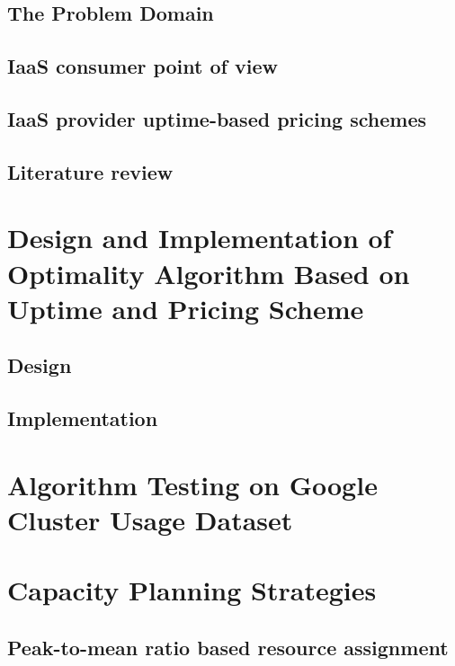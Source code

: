 \documentclass[]{final_report}
\begin{document}
\section{The Problem Domain}

\section{IaaS consumer point of view}

\section{IaaS provider uptime-based pricing schemes}

\section{Literature review}



\chapter{Design and Implementation of Optimality Algorithm Based on Uptime and Pricing Scheme}

\section{Design}

\section{Implementation}



\chapter{Algorithm Testing on Google Cluster Usage Dataset}


\chapter{Capacity Planning Strategies}

\section{Peak-to-mean ratio based resource assignment}
\end{document}
